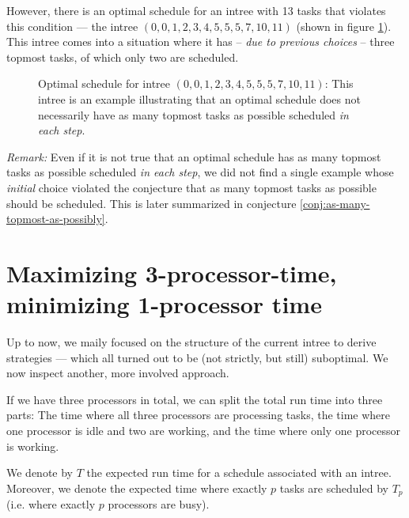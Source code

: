 However, there is an optimal schedule for an intree with 13 tasks that violates this condition ---  the intree $(0,0,1,2,3,4,5,5,5,7,10,11)$ (shown in figure \ref{fig:as-many-topmost-tasks-as-possible-false}). This intree comes into a situation where it has -- \emph{due to previous choices} -- three topmost tasks, of which only two are scheduled.

\begin{figure}[th]
  \centering
  
  \caption{Optimal schedule for intree $(0,0,1,2,3,4,5,5,5,7,10,11)$: This intree is an example illustrating that an optimal schedule does not necessarily have as many topmost tasks as possible scheduled \emph{in each step}.}
  \label{fig:as-many-topmost-tasks-as-possible-false}
\end{figure}

\emph{Remark:} Even if it is not true that an optimal schedule has as many topmost tasks as possible scheduled \emph{in each step}, we did not find a single example whose \emph{initial} choice violated the conjecture that as many topmost tasks as possible should be scheduled. This is later summarized in conjecture \ref{conj:as-many-topmost-as-possibly}.

\section{Maximizing 3-processor-time, minimizing 1-processor time}
\label{sec:p3-disproving-long-p3-and-short-p1-time}

Up to now, we maily focused on the structure of the current intree to derive strategies --- which all turned out to be (not strictly, but still) suboptimal. We now inspect another, more involved approach.

If we have three processors in total, we can split the total run time into three parts: The time where all three processors are processing tasks, the time where one processor is idle and two are working, and the time where only one processor is working.


\begin{definition}
  We denote by $T$ the expected run time for a schedule associated with an intree. 
  Moreover, we denote the expected time where exactly $p$ tasks are scheduled by $T_p$ (i.e. where exactly $p$ processors are busy).
\end{definition}

